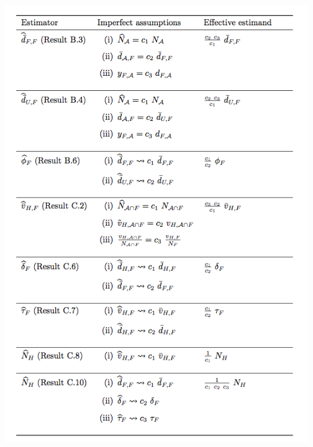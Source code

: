 \documentclass[aspectratio=169]{beamer}
\begin{document}
\begin{frame}

\begin{center}
\includegraphics[height=\textheight]{figures/feehan_estimating_2014_tabd1}
\end{center}

\end{frame}
\end{document}
